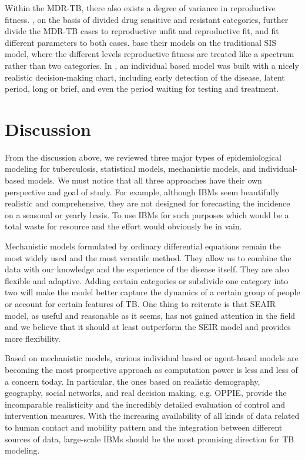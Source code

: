 \documentclass[8pt,twocolumn]{extarticle}
\begin{document}
Within the MDR-TB, there also exists a degree of variance in reproductive fitness. \cite{DR4}, on the basis of divided drug sensitive and resistant categories, further divide the MDR-TB cases to reproductive unfit and reproductive fit, and fit different parameters to both cases. \cite{DR5,DR2} base their models on the traditional SIS model, where the different levels reproductive fitness are treated like a spectrum rather than two categories. In \cite{DR3}, an individual based model was built with a nicely realistic decision-making chart, including early detection of the disease, latent period, long or brief, and even the period waiting for testing and treatment.
\section{Discussion}
From the discussion above, we reviewed three major types of epidemiological modeling for tuberculosis, statistical models, mechanistic models, and individual-based models. We must notice that all three approaches have their own perspective and goal of study. For example, although IBMs seem beautifully realistic and comprehensive, they are not designed for forecasting the incidence on a seasonal or yearly basis. To use IBMs for such purposes which would be a total waste for resource and the effort would obviously be in vain.

Mechanistic models formulated by ordinary differential equations remain the most widely used and the most versatile method. They allow us to combine the data with our knowledge and the experience of the disease itself. They are also flexible and adaptive. Adding certain categories or subdivide one category into two will make the model better capture the dynamics of a certain group of people or account for certain features of TB. One thing to reiterate is that SEAIR model, as useful and reasonable as it seems, has not gained attention in the field and we believe that it should at least outperform the SEIR model and provides more flexibility.

Based on mechanistic models, various individual based or agent-based models are becoming the most prospective approach as computation power is less and less of a concern today. In particular, the ones based on realistic demography, geography, social networks, and real decision making, e.g. OPPIE, provide the incomparable realisticity and the incredibly detailed evaluation of control and intervention measures. With the increasing availability of all kinds of data related to human contact and mobility pattern and the integration between different sources of data, large-scale IBMs should be the most promising direction for TB modeling.
\end{document}
